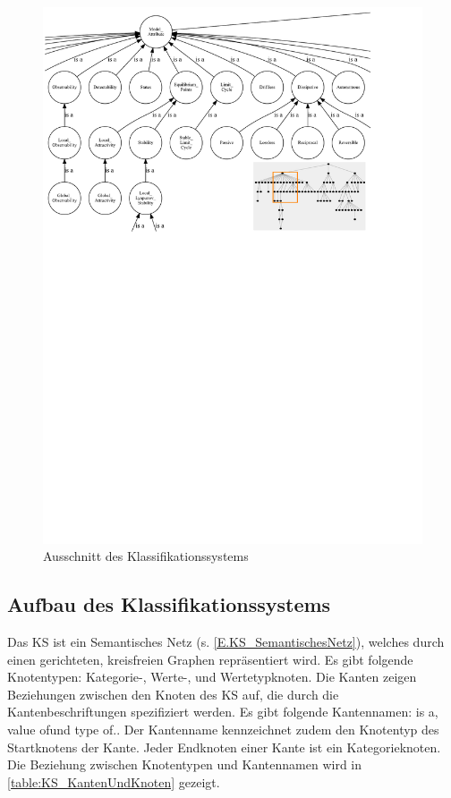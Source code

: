 \begin{figure}[bh]
	\centering
	\includegraphics[trim=0 680.7 109.5 0, clip, width=0.9\linewidth]{KS_Snippet}
	\caption{Ausschnitt des Klassifikationssystems}
	\label{fig:KS_Snippet}
\end{figure}

\subsection{Aufbau des Klassifikationssystems}
\label{Ch:Ergebniss:Sec:KS:SubSec:Aufbau}
Das KS ist ein Semantisches Netz (s. \autoref{E.KS_SemantischesNetz}), welches durch einen gerichteten, kreisfreien Graphen repräsentiert wird. Es gibt folgende Knotentypen: Kategorie-, Werte-, und Wertetypknoten. 
Die Kanten zeigen Beziehungen zwischen den Knoten des KS auf, die durch die Kantenbeschriftungen spezifiziert werden. Es gibt folgende Kantennamen: \glqq is a\grqq, \glqq value of\grqq und \glqq type of\grqq.. Der Kantenname kennzeichnet zudem den Knotentyp des Startknotens der Kante. Jeder Endknoten einer Kante ist ein Kategorieknoten. Die Beziehung zwischen Knotentypen und Kantennamen wird in \autoref{table:KS_KantenUndKnoten} gezeigt.

